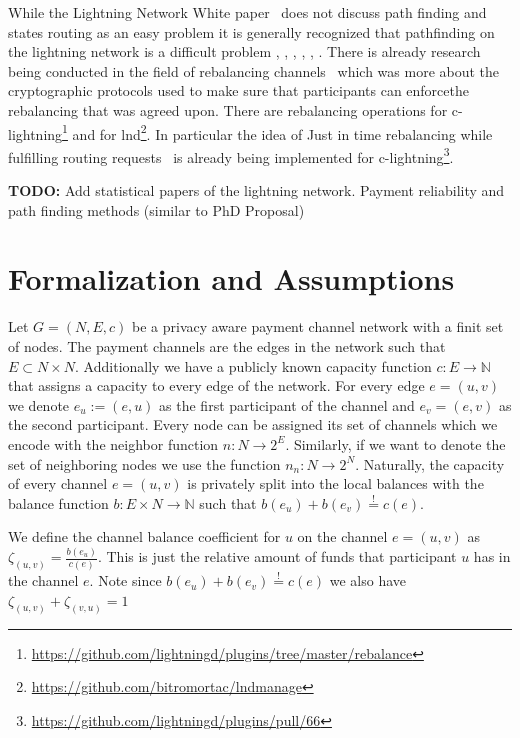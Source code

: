 \documentclass[a4paper]{paper}
\begin{document}
While the Lightning Network White paper~\cite{poon2016bitcoin} does not discuss path finding and states routing as an easy problem it is generally recognized that pathfinding on the lightning network is a difficult problem \cite{piatkivskyi2018split}, \cite{prihodko2016flare}, \cite{bagaria2019boomerang}, \cite{pickhardt2019pathfinding}, \cite{grunspan2018ant}, \cite{sivaraman2018routing}.
There is already research being conducted in the field of rebalancing channels~\cite{khalil2017revive} which was more about the cryptographic protocols used to make sure that participants can enforcethe rebalancing that was agreed upon.
There are rebalancing operations for c-lightning\footnote{\url{https://github.com/lightningd/plugins/tree/master/rebalance}} and for lnd\footnote{\url{https://github.com/bitromortac/lndmanage}}.
In particular the idea of Just in time rebalancing while fulfilling routing requests~\cite{pickhardt2019jit} is already being implemented for c-lightning\footnote{\url{https://github.com/lightningd/plugins/pull/66}}. 

\textbf{TODO:} Add statistical papers of the lightning network. Payment reliability and path finding methods (similar to PhD Proposal)


\section{Formalization and Assumptions}
\label{sec:formalization}

Let $G=(N,E,c)$ be a privacy aware payment channel network with a finit set of nodes.
The payment channels are the edges in the network such that $E\subset N\times N$.
Additionally we have a publicly known capacity function $c: E\longrightarrow \mathbb{N}$ that assigns a capacity to every edge of the network.
For every edge $e=(u,v)$ we denote $e_u:=(e,u)$ as the first participant of the channel and $e_v=(e,v)$ as the second participant.
Every node can be assigned its set of channels which we encode with the neighbor function $n : N \longrightarrow 2^{E}$.
Similarly, if we want to denote the set of neighboring nodes we use the function $n_n : N \longrightarrow 2^{N}$.
Naturally, the capacity of every channel $e=(u,v)$ is privately split into the local balances with the balance function $b: E\times N\longrightarrow\mathbb{N}$ such that $b(e_u)+b(e_v)\stackrel{!}{=}c(e)$.

We define the channel balance coefficient for $u$ on the channel $e=(u,v)$ as  $\zeta_{(u,v)} = \frac{b(e_u)}{c(e)}$.
This is just the relative amount of funds that participant $u$ has in the channel $e$.
Note since $b(e_u)+b(e_v)\stackrel{!}{=}c(e)$ we also have $\zeta_{(u,v)} + \zeta_{(v,u)}=1$
\end{document}

